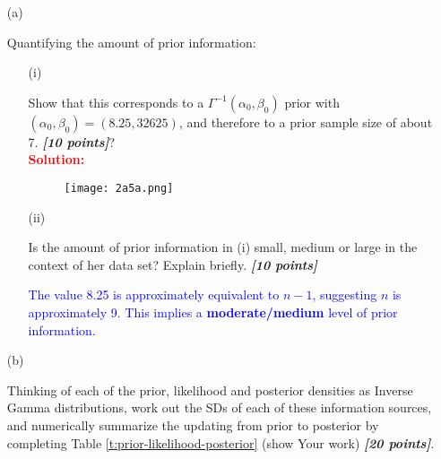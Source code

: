 \documentclass[12pt]{article}
\newcommand{\bi}[1]{\b{\i{#1}}}
\renewcommand{\b}[1]{\textbf{#1}}
\renewcommand{\i}[1]{\textit{#1}}
\begin{document}
\begin{itemize}
\begin{itemize}
\begin{itemize}

\item[(a)] 

Quantifying the amount of prior information:

\begin{itemize}

\item[(i)]

Show that this corresponds to a $\Gamma^{ -1 }( \alpha_0, \beta_0 )$
prior with $( \alpha_0, \beta_0 ) = ( 8.25, 32625 )$, and therefore to a
prior sample size of about 7. \bi{[10 points]}? \\
\textcolor{red}{\textbf{Solution:}} \\
\begin{figure}[h]
    \centering
    \texttt{[image: 2a5a.png]}
\end{figure}


\item[(ii)]

Is the amount of prior information in (i) small, medium or large in the context of her data set? Explain briefly. \bi{[10 points]}

\textcolor{blue}{
The value 8.25 is approximately equivalent to \(n - 1\), suggesting \(n\) is approximately 9. This implies a \textbf{moderate/medium} level of prior information.}

\end{itemize}

\item[(b)] 

Thinking of each of the prior, likelihood and posterior densities as Inverse Gamma distributions, work out the SDs of each of these information sources, and numerically summarize 	the updating from prior to posterior by completing Table \ref{t:prior-likelihood-posterior} (show Your work) \bi{[20 points]}.


\end{itemize}
\end{itemize}
\end{itemize}
\end{document}
